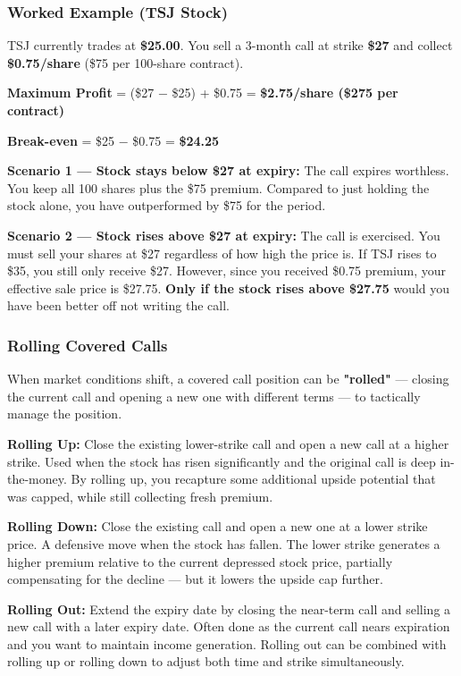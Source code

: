 \documentclass[12pt,openany]{book}
\begin{document}
\subsubsection{Worked Example (TSJ Stock)}

TSJ currently trades at \textbf{\$25.00}. You sell a 3-month call at strike \textbf{\$27} and collect \textbf{\$0.75/share} (\$75 per 100-share contract).

\textbf{Maximum Profit} = (\$27 − \$25) + \$0.75 = \textbf{\$2.75/share (\$275 per contract)}

\textbf{Break-even} = \$25 − \$0.75 = \textbf{\$24.25}

\textbf{Scenario 1 — Stock stays below \$27 at expiry:}
The call expires worthless. You keep all 100 shares plus the \$75 premium. Compared to just holding the stock alone, you have outperformed by \$75 for the period.

\textbf{Scenario 2 — Stock rises above \$27 at expiry:}
The call is exercised. You must sell your shares at \$27 regardless of how high the price is. If TSJ rises to \$35, you still only receive \$27. However, since you received \$0.75 premium, your effective sale price is \$27.75. \textbf{Only if the stock rises above \$27.75} would you have been better off not writing the call.



\subsubsection{Rolling Covered Calls}

When market conditions shift, a covered call position can be \textbf{"rolled"} — closing the current call and opening a new one with different terms — to tactically manage the position.

\textbf{Rolling Up:} Close the existing lower-strike call and open a new call at a higher strike. Used when the stock has risen significantly and the original call is deep in-the-money. By rolling up, you recapture some additional upside potential that was capped, while still collecting fresh premium.

\textbf{Rolling Down:} Close the existing call and open a new one at a lower strike price. A defensive move when the stock has fallen. The lower strike generates a higher premium relative to the current depressed stock price, partially compensating for the decline — but it lowers the upside cap further.

\textbf{Rolling Out:} Extend the expiry date by closing the near-term call and selling a new call with a later expiry date. Often done as the current call nears expiration and you want to maintain income generation. Rolling out can be combined with rolling up or rolling down to adjust both time and strike simultaneously.
\end{document}
